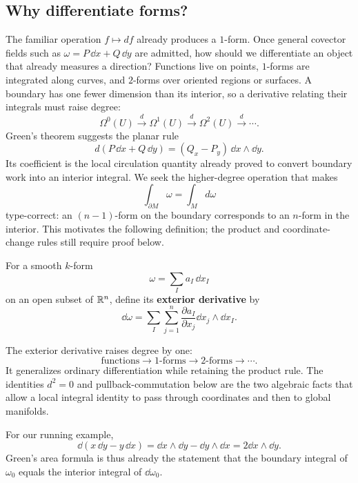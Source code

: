 \subsection*{Why differentiate forms?}
The familiar operation $f\mapsto df$ already produces a $1$-form.
Once general covector fields such as $\omega=P\,\dd x+Q\,\dd y$ are
admitted, how should we differentiate an object that already measures a
direction? Functions live on points, $1$-forms are integrated along curves,
and $2$-forms over oriented regions or surfaces. A boundary has one fewer
dimension than its interior, so a derivative relating their integrals must
raise degree:
\[
\Omega^0(U)\xrightarrow{d}\Omega^1(U)\xrightarrow{d}\Omega^2(U)
\xrightarrow{d}\cdots.
\]
Green's theorem suggests the planar rule
\[
d(P\,\dd x+Q\,\dd y)=(Q_x-P_y)\,\dd x\wedge\dd y.
\]
Its coefficient is the local circulation quantity already proved to
convert boundary work into an interior integral. We seek the higher-degree
operation that makes
\[
\int_{\partial M}\omega=\int_M d\omega
\]
 type-correct:
an $(n-1)$-form on the boundary corresponds to an $n$-form in the interior.
This motivates the following definition; the product and coordinate-change
rules still require proof below.

\begin{definition}\label{def:exterior-derivative}
For a smooth $k$-form
\[
\omega=
\sum_Ia_I\,\dd x_I
\]
on an open subset of $\mathbb{R}^n$, define its \textbf{exterior derivative} by
\[
\dd\omega
=
\sum_I\sum_{j=1}^{n}
\frac{\partial a_I}{\partial x_j}
\dd x_j\wedge\dd x_I.
\]
\end{definition}

\begin{remark}
The exterior derivative raises degree by one:
\[
\text{functions}\longrightarrow1\text{-forms}\longrightarrow2\text{-forms}
\longrightarrow\cdots.
\]
It generalizes ordinary differentiation while retaining the product rule.
The identities \(d^2=0\) and pullback-commutation below are the two algebraic
facts that allow a local integral identity to pass through coordinates and
then to global manifolds.
\end{remark}

For our running example,
\[
\dd(x\,\dd y-y\,\dd x)=\dd x\wedge\dd y-\dd y\wedge\dd x
=2\dd x\wedge\dd y.
\]
Green's area formula is thus already the statement that the boundary
integral of $\omega_0$ equals the interior integral of $\dd\omega_0$.

